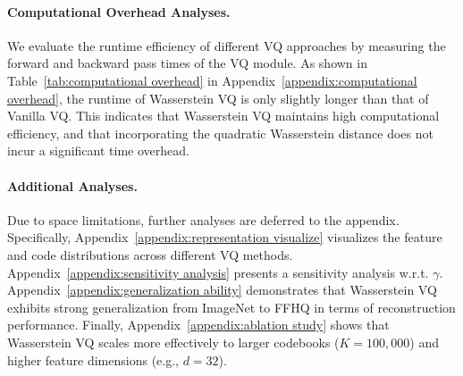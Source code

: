 \paragraph{Computational Overhead Analyses.} We evaluate the runtime efficiency of different VQ approaches by measuring the forward and backward pass times of the VQ module. As shown in Table~\ref{tab:computational overhead} in Appendix~\ref{appendix:computational overhead}, the runtime of Wasserstein VQ is only slightly longer than that of Vanilla VQ. This indicates that Wasserstein VQ maintains high computational efficiency, and that incorporating the quadratic Wasserstein distance does not incur a significant time overhead.
\vspace{-2ex}

\paragraph{Additional Analyses.} Due to space limitations, further analyses are deferred to the appendix. Specifically, Appendix~\ref{appendix:representation visualize} visualizes the feature and code distributions across different VQ methods. Appendix~\ref{appendix:sensitivity analysis} presents a sensitivity analysis w.r.t. $\gamma$. Appendix~\ref{appendix:generalization ability} demonstrates that Wasserstein VQ exhibits strong generalization from ImageNet to FFHQ in terms of reconstruction performance. Finally, Appendix~\ref{appendix:ablation study} shows that Wasserstein VQ scales more effectively to larger codebooks ($K=100{,}000$) and higher feature dimensions (e.g., $d=32$).

